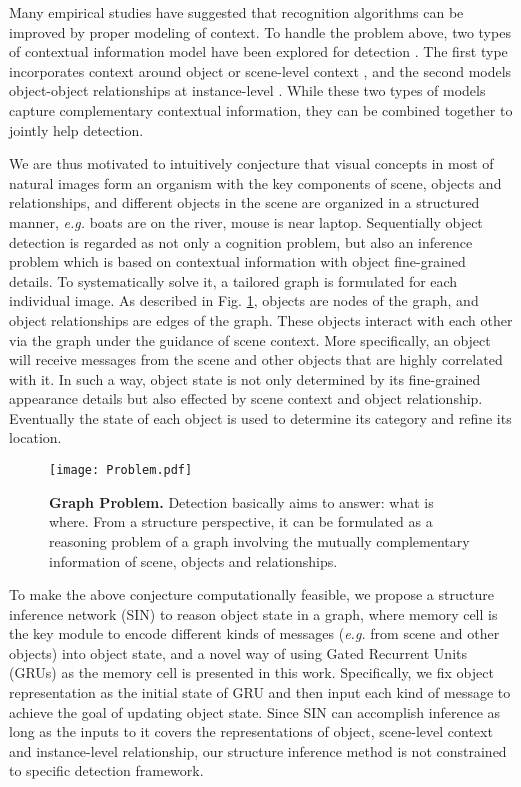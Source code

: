 \documentclass[10pt,twocolumn,letterpaper]{article}
\begin{document}
Many empirical studies \cite{AES, COLA, LSC, CBVS, Context, TRC, TB} have suggested that recognition algorithms can be improved by proper modeling of context. To handle the problem above, two types of contextual information model have been explored for detection \cite{SM}. The first type incorporates context around object or scene-level context \cite{ION, GBD, CPF}, and the second models object-object relationships at instance-level \cite{EPC, SM, Context}. While these two types of models capture complementary contextual information, they can be combined together to jointly help detection.

We are thus motivated to intuitively conjecture that visual concepts in most of natural images form an organism with the key components of scene, objects and relationships, and different objects in the scene are organized in a structured manner, {\em e.g.} boats are on the river, mouse is near laptop. Sequentially object detection is regarded as not only a cognition problem, but also an inference problem which is based on contextual information with object fine-grained details. To systematically solve it, a tailored graph is formulated for each individual image. As described in Fig.  \ref{fig:Problem}, objects are nodes of the graph, and object relationships are edges of the graph. These objects interact with each other via the graph under the guidance of scene context. More specifically, an object will receive messages from the scene and other objects that are highly correlated with it. In such a way, object state is not only determined by its fine-grained appearance details but also effected by scene context and object relationship. Eventually the state of each object is used to determine its category and refine its location.

\begin{figure}[t]
\begin{center}
   \texttt{[image: Problem.pdf]}
\end{center}
\vspace{-2ex}
   \caption{{\bf Graph Problem.} Detection basically aims to answer: what is where. From a structure perspective, it can be formulated as a  reasoning problem of a graph involving the mutually complementary information of scene, objects and relationships.}
\label{fig:Problem}
\vspace{-2.5ex}
\end{figure}

To make the above conjecture computationally feasible, we propose a structure inference network (SIN) to reason object state in a graph, where memory cell is the key module to encode different kinds of messages ({\em e.g.} from scene and other objects) into object state, and a novel way of using Gated Recurrent Units (GRUs) \cite{GRU} as the memory cell is presented in this work. Specifically, we fix object representation as the initial state of GRU and then input each kind of message to achieve the goal of updating object state. {Since SIN can accomplish inference as long as the inputs to it covers the representations of object, scene-level context and instance-level relationship, our structure inference method is not constrained to specific detection framework.}
\end{document}

